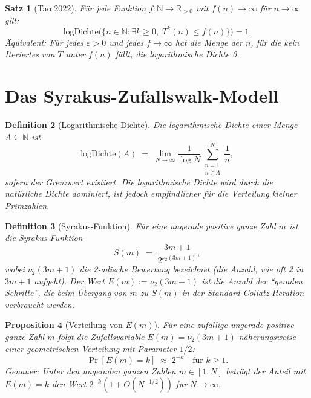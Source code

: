 \documentclass[12pt,a4paper]{article}
\newtheorem{theorem}{Satz}[section]
\newtheorem{proposition}[theorem]{Proposition}
\newtheorem{definition}[theorem]{Definition}
\begin{document}
\begin{theorem}[Tao 2022]\label{thm:tao_hauptsatz}
Für jede Funktion $f\colon \mathbb{N} \to \mathbb{R}_{>0}$ mit $f(n) \to \infty$ für
$n \to \infty$ gilt:
\[
  \mathrm{logDichte}\bigl(\{ n \in \mathbb{N} : \exists k \geq 0,\; T^k(n) \leq f(n) \}\bigr) = 1.
\]
Äquivalent: Für jedes $\varepsilon > 0$ und jedes $f \to \infty$ hat die Menge der $n$,
für die kein Iteriertes von $T$ unter $f(n)$ fällt, die logarithmische Dichte 0.
\end{theorem}

\section{Das Syrakus-Zufallswalk-Modell}

\begin{definition}[Logarithmische Dichte]\label{def:logdichte}
Die \emph{logarithmische Dichte} einer Menge $A \subseteq \mathbb{N}$ ist
\[
  \mathrm{logDichte}(A) \;=\; \lim_{N \to \infty} \frac{1}{\log N} \sum_{\substack{n=1 \\ n \in A}}^{N} \frac{1}{n},
\]
sofern der Grenzwert existiert. Die logarithmische Dichte wird durch die natürliche Dichte
dominiert, ist jedoch empfindlicher für die Verteilung kleiner Primzahlen.
\end{definition}

\begin{definition}[Syrakus-Funktion]\label{def:syrakus}
Für eine ungerade positive ganze Zahl $m$ ist die \emph{Syrakus-Funktion}
\[
  S(m) \;=\; \frac{3m+1}{2^{\nu_2(3m+1)}},
\]
wobei $\nu_2(3m+1)$ die 2-adische Bewertung bezeichnet (die Anzahl, wie oft 2 in $3m+1$ aufgeht).
Der Wert $E(m) := \nu_2(3m+1)$ ist die Anzahl der ``geraden Schritte'', die beim
Übergang von $m$ zu $S(m)$ in der Standard-Collatz-Iteration verbraucht werden.
\end{definition}

\begin{proposition}[Verteilung von $E(m)$]\label{prop:vert_E}
Für eine zufällige ungerade positive ganze Zahl $m$ folgt die Zufallsvariable
$E(m) = \nu_2(3m+1)$ näherungsweise einer geometrischen Verteilung mit Parameter $1/2$:
\[
  \Pr[E(m) = k] \;\approx\; 2^{-k} \quad \text{für } k \geq 1.
\]
Genauer: Unter den ungeraden ganzen Zahlen $m \in [1, N]$ beträgt der Anteil mit
$E(m) = k$ den Wert $2^{-k}(1 + O(N^{-1/2}))$ für $N \to \infty$.
\end{proposition}
\end{document}
